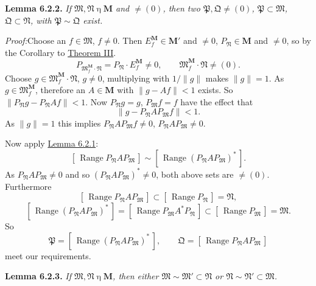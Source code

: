 \documentclass[12pt,b5paper,twoside]{article}
\newcommand{\M}{\mathbf M}
\newcommand{\clos}[1]{[\,#1\,]}
\newcommand{\Lemma}[1]{%
  \par\smallskip\noindent\phantomsection\label{lem:#1}\textbf{Lemma #1.}\enspace
}
\newcommand{\Proof}{\par\noindent\textit{Proof:}\enspace}
\newcommand{\lemref}[1]{\hyperref[lem:#1]{Lemma #1}}
\newcommand{\thmref}[1]{\hyperref[thm:#1]{Theorem #1}}
\begin{document}
\Lemma{6.2.2} {\itshape
If \(\mathfrak M,\mathfrak N\mathbin{\eta}\M\) and \(\ne(0)\), then two
\(\mathfrak P,\mathfrak Q\ne(0)\),
\(\mathfrak P\subset\mathfrak M\), \(\mathfrak Q\subset\mathfrak N\),
with \(\mathfrak P\sim\mathfrak Q\) exist.
}

\Proof Choose an \(f\in\mathfrak M\), \(f\ne0\). Then
\(E_f^{\M}\in\M'\) and \(\ne0\), \(P_{\mathfrak N}\in\M\) and
\(\ne0\), so by the Corollary to \thmref{III}.
\[
 P_{\mathfrak M_f^{\M}\cdot\mathfrak N}
   =P_{\mathfrak N}\cdot E_f^{\M}\ne0,
 \qquad
 \mathfrak M_f^{\M}\cdot\mathfrak N\ne(0).
\]
Choose \(g\in\mathfrak M_f^{\M}\cdot\mathfrak N\), \(g\ne0\),
multiplying with \(1/\lVert g\rVert\) makes \(\lVert g\rVert=1\). As
\(g\in\mathfrak M_f^{\M}\), therefore an \(A\in\M\) with
\(\lVert g-Af\rVert<1\) exists. So
\(\lVert P_{\mathfrak N}g-P_{\mathfrak N}Af\rVert<1\). Now
\(P_{\mathfrak N}g=g\), \(P_{\mathfrak M}f=f\) have the effect that
\[
 \lVert g-P_{\mathfrak N}AP_{\mathfrak M}f\rVert<1.
\]
As \(\lVert g\rVert=1\) this implies
\(P_{\mathfrak N}AP_{\mathfrak M}f\ne0\),
\(P_{\mathfrak N}AP_{\mathfrak M}\ne0\).

Now apply \lemref{6.2.1}:
\[
 \clos{\operatorname{Range}P_{\mathfrak N}AP_{\mathfrak M}}
 \sim
 \clos{\operatorname{Range}(P_{\mathfrak N}AP_{\mathfrak M})^*}.
\]
As \(P_{\mathfrak N}AP_{\mathfrak M}\ne0\) and so
\((P_{\mathfrak N}AP_{\mathfrak M})^*\ne0\), both above sets are
\(\ne(0)\). Furthermore
\[
 \clos{\operatorname{Range}P_{\mathfrak N}AP_{\mathfrak M}}
 \subset
 \clos{\operatorname{Range}P_{\mathfrak N}}=\mathfrak N,
\]
\[
 \clos{\operatorname{Range}(P_{\mathfrak N}AP_{\mathfrak M})^*}
 =\clos{\operatorname{Range}P_{\mathfrak M}A^*P_{\mathfrak N}}
 \subset
 \clos{\operatorname{Range}P_{\mathfrak M}}=\mathfrak M.
\]
So
\[
 \mathfrak P=
 \clos{\operatorname{Range}(P_{\mathfrak N}AP_{\mathfrak M})^*},
 \qquad
 \mathfrak Q=
 \clos{\operatorname{Range}P_{\mathfrak N}AP_{\mathfrak M}}
\]
meet our requirements.

\Lemma{6.2.3} {\itshape
If \(\mathfrak M,\mathfrak N\mathbin{\eta}\M\), then either
\(\mathfrak M\sim\mathfrak M'\subset\mathfrak N\) or
\(\mathfrak N\sim\mathfrak N'\subset\mathfrak M\).
}
\end{document}
